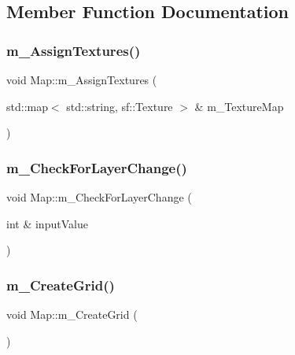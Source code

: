 \subsection{Member Function Documentation}
\mbox{\label{class_map_a31635a85e9b5d86369ff0765d03dff93}} 
\subsubsection{\texorpdfstring{m\+\_\+\+Assign\+Textures()}{m\_AssignTextures()}}
{\footnotesize\ttfamily void Map\+::m\+\_\+\+Assign\+Textures (\begin{DoxyParamCaption}\item[{std\+::map$<$ std\+::string, sf\+::\+Texture $>$ \&}]{m\+\_\+\+Texture\+Map }\end{DoxyParamCaption})}

\mbox{\label{class_map_a024e4daa304e427c35119ae4baa01129}} 
\subsubsection{\texorpdfstring{m\+\_\+\+Check\+For\+Layer\+Change()}{m\_CheckForLayerChange()}}
{\footnotesize\ttfamily void Map\+::m\+\_\+\+Check\+For\+Layer\+Change (\begin{DoxyParamCaption}\item[{int \&}]{input\+Value }\end{DoxyParamCaption})}

\mbox{\label{class_map_a2cc424825baa72efdc7ceb1580eabf3a}} 
\subsubsection{\texorpdfstring{m\+\_\+\+Create\+Grid()}{m\_CreateGrid()}}
{\footnotesize\ttfamily void Map\+::m\+\_\+\+Create\+Grid (\begin{DoxyParamCaption}{ }\end{DoxyParamCaption})}


